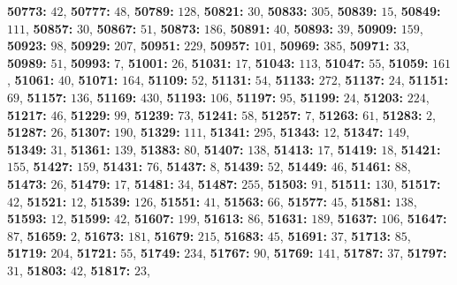 \textsf{\bfseries 50773:} $42$, \textsf{\bfseries 50777:} $48$, \textsf{\bfseries 50789:} $128$, \textsf{\bfseries 50821:} $30$, \textsf{\bfseries 50833:} $305$, \textsf{\bfseries 50839:} $15$, \textsf{\bfseries 50849:} $111$, \textsf{\bfseries 50857:} $30$, \textsf{\bfseries 50867:} $51$, \textsf{\bfseries 50873:} $186$, \textsf{\bfseries 50891:} $40$, \textsf{\bfseries 50893:} $39$, \textsf{\bfseries 50909:} $159$, \textsf{\bfseries 50923:} $98$, \textsf{\bfseries 50929:} $207$, \textsf{\bfseries 50951:} $229$, \textsf{\bfseries 50957:} $101$, \textsf{\bfseries 50969:} $385$, \textsf{\bfseries 50971:} $33$, \textsf{\bfseries 50989:} $51$, \textsf{\bfseries 50993:} $7$, \textsf{\bfseries 51001:} $26$, \textsf{\bfseries 51031:} $17$, \textsf{\bfseries 51043:} $113$, \textsf{\bfseries 51047:} $55$, \textsf{\bfseries 51059:} $161$, \textsf{\bfseries 51061:} $40$, \textsf{\bfseries 51071:} $164$, \textsf{\bfseries 51109:} $52$, \textsf{\bfseries 51131:} $54$, \textsf{\bfseries 51133:} $272$, \textsf{\bfseries 51137:} $24$, \textsf{\bfseries 51151:} $69$, \textsf{\bfseries 51157:} $136$, \textsf{\bfseries 51169:} $430$, \textsf{\bfseries 51193:} $106$, \textsf{\bfseries 51197:} $95$, \textsf{\bfseries 51199:} $24$, \textsf{\bfseries 51203:} $224$, \textsf{\bfseries 51217:} $46$, \textsf{\bfseries 51229:} $99$, \textsf{\bfseries 51239:} $73$, \textsf{\bfseries 51241:} $58$, \textsf{\bfseries 51257:} $7$, \textsf{\bfseries 51263:} $61$, \textsf{\bfseries 51283:} $2$, \textsf{\bfseries 51287:} $26$, \textsf{\bfseries 51307:} $190$, \textsf{\bfseries 51329:} $111$, \textsf{\bfseries 51341:} $295$, \textsf{\bfseries 51343:} $12$, \textsf{\bfseries 51347:} $149$, \textsf{\bfseries 51349:} $31$, \textsf{\bfseries 51361:} $139$, \textsf{\bfseries 51383:} $80$, \textsf{\bfseries 51407:} $138$, \textsf{\bfseries 51413:} $17$, \textsf{\bfseries 51419:} $18$, \textsf{\bfseries 51421:} $155$, \textsf{\bfseries 51427:} $159$, \textsf{\bfseries 51431:} $76$, \textsf{\bfseries 51437:} $8$, \textsf{\bfseries 51439:} $52$, \textsf{\bfseries 51449:} $46$, \textsf{\bfseries 51461:} $88$, \textsf{\bfseries 51473:} $26$, \textsf{\bfseries 51479:} $17$, \textsf{\bfseries 51481:} $34$, \textsf{\bfseries 51487:} $255$, \textsf{\bfseries 51503:} $91$, \textsf{\bfseries 51511:} $130$, \textsf{\bfseries 51517:} $42$, \textsf{\bfseries 51521:} $12$, \textsf{\bfseries 51539:} $126$, \textsf{\bfseries 51551:} $41$, \textsf{\bfseries 51563:} $66$, \textsf{\bfseries 51577:} $45$, \textsf{\bfseries 51581:} $138$, \textsf{\bfseries 51593:} $12$, \textsf{\bfseries 51599:} $42$, \textsf{\bfseries 51607:} $199$, \textsf{\bfseries 51613:} $86$, \textsf{\bfseries 51631:} $189$, \textsf{\bfseries 51637:} $106$, \textsf{\bfseries 51647:} $87$, \textsf{\bfseries 51659:} $2$, \textsf{\bfseries 51673:} $181$, \textsf{\bfseries 51679:} $215$, \textsf{\bfseries 51683:} $45$, \textsf{\bfseries 51691:} $37$, \textsf{\bfseries 51713:} $85$, \textsf{\bfseries 51719:} $204$, \textsf{\bfseries 51721:} $55$, \textsf{\bfseries 51749:} $234$, \textsf{\bfseries 51767:} $90$, \textsf{\bfseries 51769:} $141$, \textsf{\bfseries 51787:} $37$, \textsf{\bfseries 51797:} $31$, \textsf{\bfseries 51803:} $42$, \textsf{\bfseries 51817:} $23$, 
